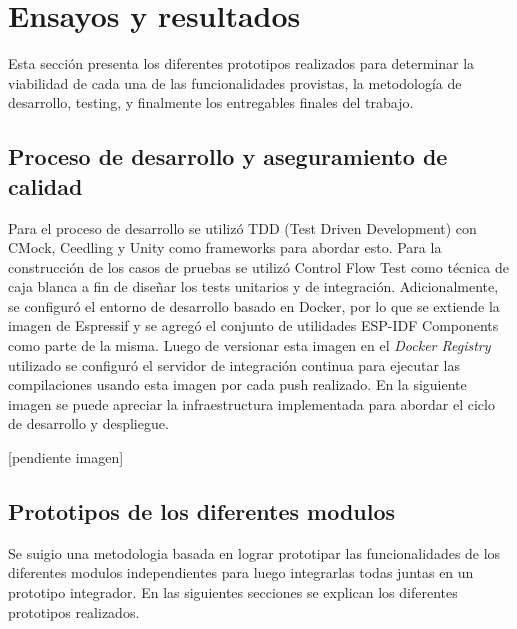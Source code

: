 
\chapter{Ensayos y resultados} %

\label{Chapter4} %

Esta sección presenta los diferentes prototipos realizados para determinar la viabilidad de cada una de las funcionalidades provistas, la metodología de desarrollo, testing, y finalmente los entregables finales del trabajo.

\section{Proceso de desarrollo y aseguramiento de calidad}
\label{sec:pruebasHW}

Para el proceso de desarrollo se utilizó TDD (Test Driven Development) con CMock, Ceedling y Unity como frameworks para abordar esto. Para la construcción de los casos de pruebas se utilizó Control Flow Test como técnica de caja blanca a fin de diseñar los tests unitarios y de integración. 
Adicionalmente, se configuró el entorno de desarrollo basado en Docker, por lo que se extiende la imagen de Espressif y se agregó el conjunto de utilidades ESP-IDF Components como parte de la misma. Luego de versionar esta imagen en el \textit{Docker Registry} utilizado se configuró el servidor de integración continua para ejecutar las compilaciones usando esta imagen por cada push realizado.
En la siguiente imagen se puede apreciar la infraestructura implementada para abordar el ciclo de desarrollo y despliegue. 


[pendiente imagen]

\section{Prototipos de los diferentes modulos}
\label{sec:pruebasHW}

Se suigio una metodologia basada en lograr prototipar las funcionalidades de los diferentes modulos independientes para luego integrarlas todas juntas en un prototipo integrador. En las siguientes secciones se explican los diferentes prototipos realizados.


